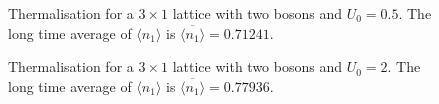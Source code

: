 \documentclass[prb, twocolumn, final]{revtex4-1}
\theoremstyle{plain}
\begin{document}
\begin{figure}[H]
     \caption{Thermalisation for a $3\times 1$ lattice with two bosons and
              $U_{0} = 0.5$. The long time average of $\langle n_1 \rangle$ is
              $\overline{\langle n_1 \rangle}=0.71241$.}
\end{figure}

\begin{figure}[H]
     \caption{Thermalisation for a $3\times 1$ lattice with two bosons and
              $U_{0} = 2$. The long time average of $\langle n_1 \rangle$ is
              $\overline{\langle n_1 \rangle}=0.77936.$}
\end{figure}
\end{document}
